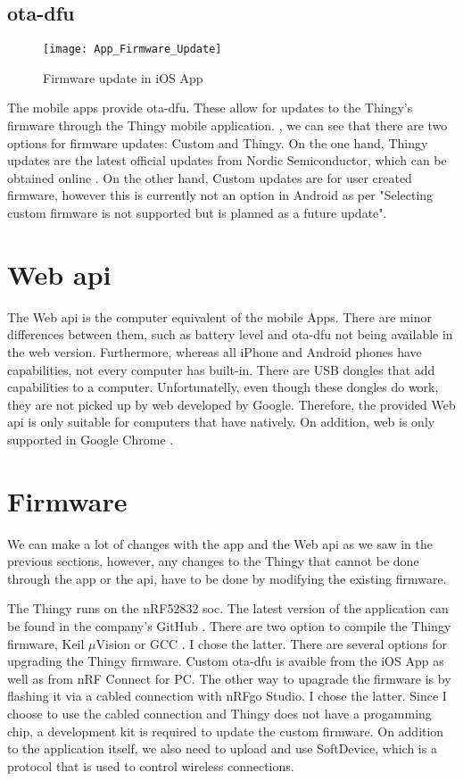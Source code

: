 \subsection{\gls{ota-dfu}}
\begin{figure}[hbt!]
	\centering
	\texttt{[image: App\_Firmware\_Update]}
	\caption{Firmware update in iOS App}
	\label{fig:app_firmware}
\end{figure}
The mobile apps provide \gls{ota-dfu}. These allow for updates to the Thingy's firmware through the Thingy mobile application. , we can see that there are two options for firmware updates: Custom and Thingy. On the one hand, Thingy updates are the latest official updates from Nordic Semiconductor, which can be obtained online \cite{FirmwareDownload}. On the other hand, Custom updates are for user created firmware, however this is currently not an option in Android as per \cite{DocFeatures} "Selecting custom firmware is not supported but is planned as a future update".

\section{Web \bt \gls{api}}
The Web \bt \gls{api} \cite{WebAPI} is the computer equivalent of the mobile Apps. There are minor differences between them, such as battery level and \gls{ota-dfu} not being available in the web version. Furthermore, whereas all iPhone and Android phones have \bt capabilities, not every computer has \bt built-in. There are USB dongles that add \bt capabilities to a computer. Unfortunatelly, even though these dongles do work, they are not picked up by web \bt developed by Google. Therefore, the provided Web \bt \gls{api}  is only suitable for computers that have \bt natively. On addition, web \bt is only supported in Google Chrome \cite{WebBluetooth}.

\section{Firmware}
We can make a lot of changes with the app and the Web \bt \gls{api} as we saw in the previous sections, however, any changes to the Thingy that cannot be done through the app or the \gls{api}, have to be done by modifying the existing firmware. 

The Thingy runs on the nRF52832 \gls{soc}. The latest version of the application can be found in the company's GitHub \cite{FirmwareGH}. There are two option to compile the Thingy firmware, Keil $\mu${Vision} or GCC \cite{compilefirmware}. I chose the latter. There are several options for upgrading the Thingy firmware. Custom \gls{ota-dfu} is avaible from the iOS App as well as from nRF Connect for PC. The other way to upagrade the firmware is by flashing it via a cabled connection with nRFgo Studio. I chose the latter. Since I choose to use the cabled connection and Thingy does not have a progamming chip, a development kit is required to update the custom firmware. On addition to the application itself, we also need to upload and use SoftDevice, which is a protocol that is used to control wireless connections.

